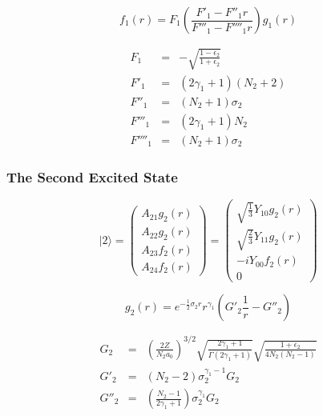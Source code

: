 \documentclass[a4paper,titlepage]{report}
\newcommand{\ket}[1]{|#1 \rangle}
\begin{document}
\begin{equation}
	\boxed{f_1(r) = F_1 \left( \frac{F'_1 - F''_1 r}{F'''_1 - F''''_1 r} \right) g_1(r)}
\end{equation}

\begin{eqnarray*}
	F_1 	& = & -\sqrt{\frac{1 - \epsilon_2}{1 + \epsilon_2}}  \\
	F'_1 	& = & (2\gamma_1 + 1)(N_2 + 2)  \\
	F''_1 	& = & (N_2 + 1)\sigma_2 \\
	F'''_1 	& = & (2\gamma_1 + 1)N_2 \\ 
	F''''_1 & = & (N_2 + 1)\sigma_2
\end{eqnarray*}


		\subsubsection{The Second Excited State}
\begin{equation}
	\ket{2} = 
		\left(
			\begin{array}{c}
				A_{21} g_2(r) \\
				A_{22} g_2(r) \\
				A_{23} f_2(r) \\
				A_{24} f_2(r)
			\end{array}
		\right)
		=
		\left(
			\begin{array}{c}
				\sqrt{\frac{1}{3}} Y_{10} g_2(r) \\
			    \sqrt{\frac{2}{3}} Y_{11} g_2(r) \\
			    -i Y_{00} f_2(r) \\
				0
			\end{array}
		\right)
\end{equation}

\begin{equation}
	\boxed{
		g_2(r) = e^{-\frac{1}{2}\sigma_2 r} r^{\gamma_1}
				    \left(
						G'_2 \frac{1}{r} - G''_2
					\right) 
	}
\end{equation}

\begin{eqnarray*}
	G_2 	& = & \left( \frac{2Z}{N_2 a_0} \right)^{3/2}
				  \sqrt{\frac{2\gamma_1 + 1}{\Gamma(2\gamma_1 + 1)}} 
				  \sqrt{\frac{1+\epsilon_2}{4N_2 (N_2 - 1)}} \\
	G'_2	& = & (N_2 - 2) \sigma_2^{\gamma_1 - 1} G_2 \\
	G''_2 	& = & \left( \frac{N_2 - 1}{2\gamma_1 + 1} \right) \sigma_2^{\gamma_1} G_2
\end{eqnarray*}
\end{document}
